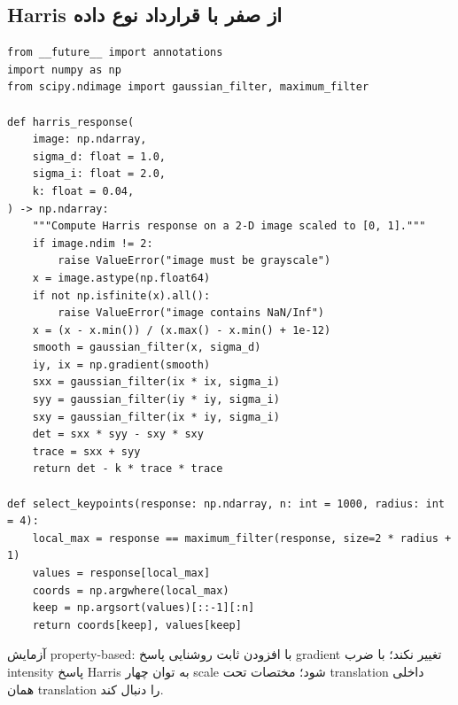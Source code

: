 \documentclass[12pt,openany,oneside]{book}
\begin{document}
\subsection{Harris از صفر با قرارداد نوع داده}
\begin{latin}
\begin{lstlisting}
from __future__ import annotations
import numpy as np
from scipy.ndimage import gaussian_filter, maximum_filter

def harris_response(
    image: np.ndarray,
    sigma_d: float = 1.0,
    sigma_i: float = 2.0,
    k: float = 0.04,
) -> np.ndarray:
    """Compute Harris response on a 2-D image scaled to [0, 1]."""
    if image.ndim != 2:
        raise ValueError("image must be grayscale")
    x = image.astype(np.float64)
    if not np.isfinite(x).all():
        raise ValueError("image contains NaN/Inf")
    x = (x - x.min()) / (x.max() - x.min() + 1e-12)
    smooth = gaussian_filter(x, sigma_d)
    iy, ix = np.gradient(smooth)
    sxx = gaussian_filter(ix * ix, sigma_i)
    syy = gaussian_filter(iy * iy, sigma_i)
    sxy = gaussian_filter(ix * iy, sigma_i)
    det = sxx * syy - sxy * sxy
    trace = sxx + syy
    return det - k * trace * trace

def select_keypoints(response: np.ndarray, n: int = 1000, radius: int = 4):
    local_max = response == maximum_filter(response, size=2 * radius + 1)
    values = response[local_max]
    coords = np.argwhere(local_max)
    keep = np.argsort(values)[::-1][:n]
    return coords[keep], values[keep]
\end{lstlisting}
\end{latin}
آزمایش property-based: با افزودن ثابت روشنایی پاسخ gradient تغییر نکند؛ با ضرب intensity پاسخ Harris به توان چهار scale شود؛ مختصات تحت translation داخلی همان translation را دنبال کند.
\end{document}
